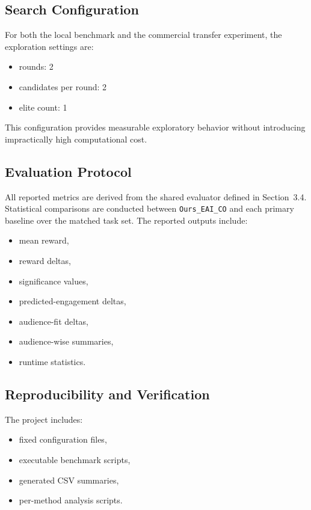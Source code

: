 \documentclass[preprint,12pt]{elsarticle}
\begin{document}
\subsection{Search Configuration}

For both the local benchmark and the commercial transfer experiment, the exploration settings are:
\begin{itemize}[leftmargin=1.5em]
    \item rounds: 2
    \item candidates per round: 2
    \item elite count: 1
\end{itemize}

This configuration provides measurable exploratory behavior without introducing impractically high computational cost.

\subsection{Evaluation Protocol}

All reported metrics are derived from the shared evaluator defined in Section~3.4. Statistical comparisons are conducted between \texttt{Ours\_EAI\_CO} and each primary baseline over the matched task set. The reported outputs include:
\begin{itemize}[leftmargin=1.5em]
    \item mean reward,
    \item reward deltas,
    \item significance values,
    \item predicted-engagement deltas,
    \item audience-fit deltas,
    \item audience-wise summaries,
    \item runtime statistics.
\end{itemize}

\subsection{Reproducibility and Verification}

The project includes:
\begin{itemize}[leftmargin=1.5em]
    \item fixed configuration files,
    \item executable benchmark scripts,
    \item generated CSV summaries,
    \item per-method analysis scripts.
\end{itemize}
\end{document}

